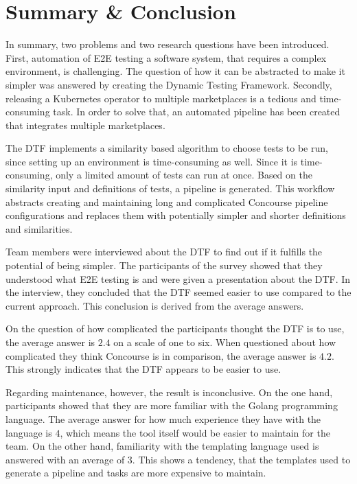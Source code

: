\chapter{Summary \& Conclusion}\label{ch:conclusion}

In summary, two problems and two research questions have been introduced.
First, automation of E2E testing a software system, that requires a complex environment, is challenging.
The question of how it can be abstracted to make it simpler was answered by creating the Dynamic Testing Framework.
Secondly, releasing a Kubernetes operator to multiple marketplaces is a tedious and time-consuming task.
In order to solve that, an automated pipeline has been created that integrates multiple marketplaces.

The DTF implements a similarity based algorithm to choose tests to be run, since setting up an environment is time-consuming as well.
Since it is time-consuming, only a limited amount of tests can run at once.
Based on the similarity input and definitions of tests, a pipeline is generated.
This workflow abstracts creating and maintaining long and complicated Concourse pipeline configurations and replaces them with potentially simpler and shorter definitions and similarities.

Team members were interviewed about the DTF to find out if it fulfills the potential of being simpler.
The participants of the survey showed that they understood what E2E testing is and were given a presentation about the DTF.
In the interview, they concluded that the DTF seemed easier to use compared to the current approach.
This conclusion is derived from the average answers.

On the question of how complicated the participants thought the DTF is to use, the average answer is $2.4$ on a scale of one to six.
When questioned about how complicated they think Concourse is in comparison, the average answer is $4.2$.
This strongly indicates that the DTF appears to be easier to use.

\pagebreak

Regarding maintenance, however, the result is inconclusive.
On the one hand, participants showed that they are more familiar with the Golang programming language.
The average answer for how much experience they have with the language is $4$, which means the tool itself would be easier to maintain for the team.
On the other hand, familiarity with the templating language used is answered with an average of $3$.
This shows a tendency, that the templates used to generate a pipeline and tasks are more expensive to maintain.

